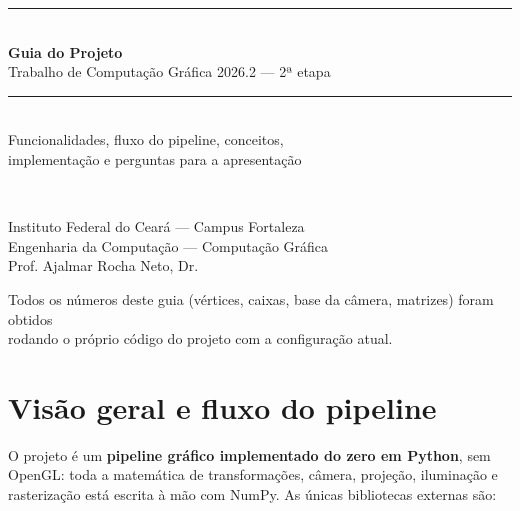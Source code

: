 \documentclass[11pt,a4paper]{article}
\begin{document}
\begin{titlepage}
\centering
\vspace*{2cm}
{\color{azul}\rule{\linewidth}{2pt}}\\[0.6cm]
{\Huge\bfseries\color{azul} Guia do Projeto}\\[0.4cm]
{\Large Trabalho de Computação Gráfica 2026.2 — 2ª etapa}\\[0.3cm]
{\color{azul}\rule{\linewidth}{2pt}}\\[1.2cm]

{\large Funcionalidades, fluxo do pipeline, conceitos,\\ implementação e perguntas para a apresentação}\\[2cm]

\\[2cm]

\begin{minipage}{0.8\linewidth}\centering\small
Instituto Federal do Ceará — Campus Fortaleza\\
Engenharia da Computação — Computação Gráfica\\
Prof. Ajalmar Rocha Neto, Dr.
\end{minipage}

\vfill
{\small Todos os números deste guia (vértices, caixas, base da câmera, matrizes) foram obtidos\\
rodando o próprio código do projeto com a configuração atual.}
\end{titlepage}

\tableofcontents
\clearpage

\section{Visão geral e fluxo do pipeline}

O projeto é um \textbf{pipeline gráfico implementado do zero em Python}, sem OpenGL: toda a
matemática de transformações, câmera, projeção, iluminação e rasterização está escrita à mão com
NumPy. As únicas bibliotecas externas são:
\end{document}
